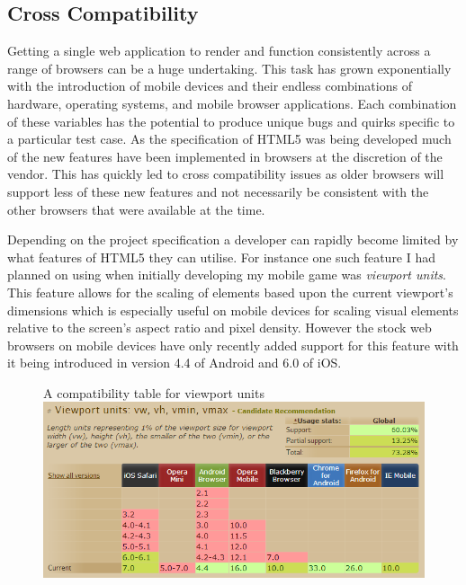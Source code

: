 \documentclass[final]{cmpreport}
\begin{document}
\subsection{Cross Compatibility}
Getting a single web application to render and function consistently across a range of browsers can be a huge undertaking. This task has grown exponentially with the introduction of mobile devices and their endless combinations of hardware, operating systems, and mobile browser applications. Each combination of these variables has the potential to produce unique bugs and quirks specific to a particular test case. As the specification of HTML5 was being developed much of the new features have been implemented in browsers at the discretion of the vendor. This has quickly led to cross compatibility issues as older browsers will support less of these new features and not necessarily be consistent with the other browsers that were available at the time.

Depending on the project specification a developer can rapidly become limited by what features of HTML5 they can utilise. For instance one such feature I had planned on using when initially developing my mobile game was \textit{viewport units}. This feature allows for the scaling of elements based upon the current viewport's dimensions which is especially useful on mobile devices for scaling visual elements relative to the screen's aspect ratio and pixel density. However the stock web browsers on mobile devices have only recently added support for this feature with it being introduced in version 4.4 of Android and 6.0 of iOS.

\begin{figure}[h]{A compatibility table for viewport units \label{viewport}}
  \includegraphics[width=1.0\textwidth]{viewport-units.png}
\end{figure}
\end{document}
